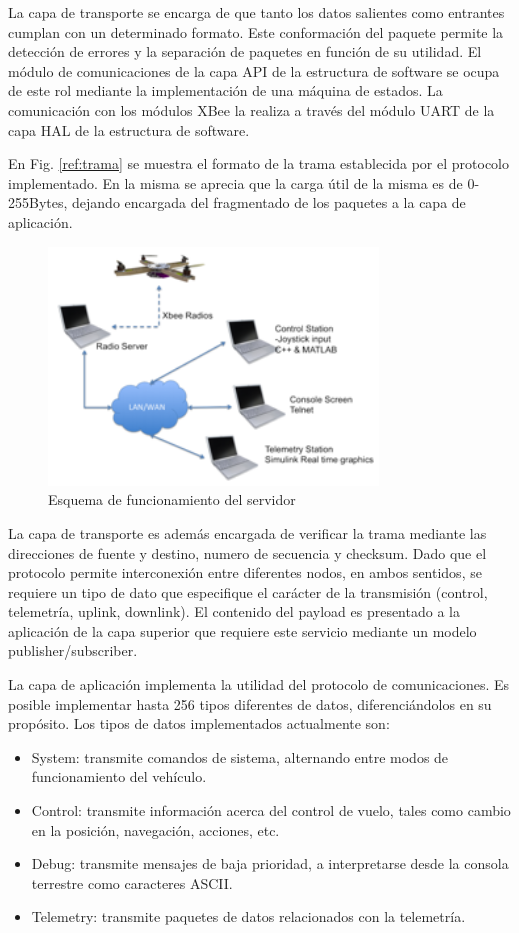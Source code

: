 \documentclass[a4paper, conference]{IEEEtran}
\begin{document}
La capa de transporte se encarga de que tanto los datos salientes como entrantes cumplan con un determinado formato. Este conformación del paquete permite la detección de errores y la separación de paquetes en función de su utilidad. El módulo de comunicaciones de la capa API de la estructura de software se ocupa de este rol mediante la implementación de una máquina de estados. La comunicación con los módulos XBee la realiza a través del módulo UART de la capa HAL de la estructura de software. 

En Fig. \ref{ref:trama} se muestra el formato de la trama establecida por el protocolo implementado. En la misma se aprecia que la carga útil de la misma es de 0-255Bytes, dejando encargada del fragmentado de los paquetes a la capa de aplicación.
 
 \begin{figure}[!t]
\centering
\includegraphics[width=3.45in]{server}
\caption{Esquema de funcionamiento del servidor}
\label{ref:server}
\end{figure}

La capa de transporte es además encargada de verificar la trama mediante las direcciones de fuente y destino, numero de secuencia y checksum. Dado que el protocolo permite interconexión entre diferentes nodos, en ambos sentidos, se requiere un tipo de dato que especifique el carácter de la transmisión (control, telemetría, uplink, downlink). El contenido del payload es presentado a la aplicación de la capa superior que requiere este servicio mediante un modelo publisher/subscriber.

La capa de aplicación implementa la utilidad del protocolo de comunicaciones. Es posible implementar hasta 256 tipos diferentes de datos, diferenciándolos en su propósito. Los tipos de datos implementados actualmente son:
\begin{itemize}
\item System: transmite comandos de sistema, alternando entre modos de funcionamiento del vehículo.
\item Control: transmite información acerca del control de vuelo, tales como cambio en la posición, navegación, acciones, etc.
\item Debug: transmite mensajes de baja prioridad, a interpretarse desde la consola terrestre como caracteres ASCII.
\item Telemetry: transmite paquetes de datos relacionados con la telemetría.
\end{itemize}
\end{document}
